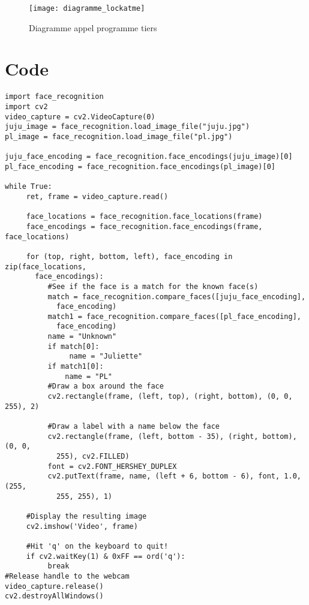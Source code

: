 \begin{figure}[h]
  \texttt{[image: diagramme\_lockatme]}
  \caption{Diagramme appel programme tiers}
  \label{fig:dialam}
\end{figure}


\chapter{Code}
\newpage
\begin{verbatim}
import face_recognition
import cv2
video_capture = cv2.VideoCapture(0)
juju_image = face_recognition.load_image_file("juju.jpg")
pl_image = face_recognition.load_image_file("pl.jpg")

juju_face_encoding = face_recognition.face_encodings(juju_image)[0]
pl_face_encoding = face_recognition.face_encodings(pl_image)[0]

while True:
     ret, frame = video_capture.read()

     face_locations = face_recognition.face_locations(frame)
     face_encodings = face_recognition.face_encodings(frame, face_locations)

     for (top, right, bottom, left), face_encoding in zip(face_locations,
       face_encodings):
          #See if the face is a match for the known face(s)
          match = face_recognition.compare_faces([juju_face_encoding],
            face_encoding)
          match1 = face_recognition.compare_faces([pl_face_encoding],
            face_encoding)
          name = "Unknown"
          if match[0]:
               name = "Juliette"
          if match1[0]:
              name = "PL"
          #Draw a box around the face
          cv2.rectangle(frame, (left, top), (right, bottom), (0, 0, 255), 2)

          #Draw a label with a name below the face
          cv2.rectangle(frame, (left, bottom - 35), (right, bottom), (0, 0,
            255), cv2.FILLED)
          font = cv2.FONT_HERSHEY_DUPLEX
          cv2.putText(frame, name, (left + 6, bottom - 6), font, 1.0, (255,
            255, 255), 1)

     #Display the resulting image
     cv2.imshow('Video', frame)

     #Hit 'q' on the keyboard to quit!
     if cv2.waitKey(1) & 0xFF == ord('q'):
          break
#Release handle to the webcam
video_capture.release()
cv2.destroyAllWindows()
\end{verbatim}
